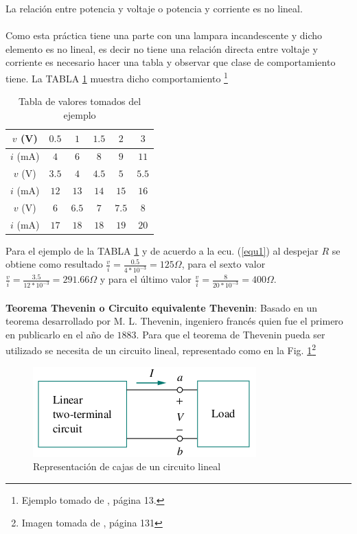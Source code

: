\documentclass[twocolumn]{IEEEtran}
\begin{document}
\noindent
La relación entre potencia y voltaje o potencia y corriente es no lineal.\\\\
\noindent
Como esta práctica tiene una parte con una lampara incandescente y dicho elemento es no lineal, es decir no tiene una relación directa entre voltaje y corriente es necesario hacer una tabla y observar que clase de comportamiento tiene. La TABLA \ref{tab1} muestra dicho comportamiento \footnote{Ejemplo tomado de \cite{nahvi}, página 13.}
\begin{table}[H]
	\centering
\begin{tabular}[c]{|c||c|c|c|c|c|} \hline
$v$ (V) & $0.5$ & $1$ & $1.5$ & $2$ & $3$ \\ \hline
$i$ (mA) & $4$ & $6$ & $8$ & $9$ & $11$ \\ \hline \hline
$v$ (V) & $3.5$ & $4$ & $4.5$ & $5$ & $5.5$ \\ \hline
$i$ (mA) & $12$ & $13$ & $14$ & $15$ & $16$ \\ \hline \hline
$v$ (V) & $6$ & $6.5$ & $7$ & $7.5$ & $8$ \\ \hline
$i$ (mA) & $17$ & $18$ & $18$ & $19$ & $20$ \\ \hline
\end{tabular}
	\caption{Tabla de valores tomados del ejemplo}
	\label{tab1}
\end{table}
\noindent
Para el ejemplo de la TABLA \ref{tab1} y de acuerdo a la ecu. (\ref{equ1}) al despejar $R$ se obtiene como resultado $\frac{v}{i} = \frac{0.5}{4*10^{-3}} = 125 \Omega$, para el sexto valor $\frac{v}{i} = \frac{3.5}{12*10^{-3}} = 291.66 \Omega$ y para el último valor $\frac{v}{i} = \frac{8}{20*10^{-3}} = 400 \Omega$.\\\\
\textbf{Teorema Thevenin o Circuito equivalente Thevenin}:
Basado en un teorema desarrollado por M. L. Thevenin, ingeniero francés quien fue el primero en publicarlo en el año de $1883$. Para que el teorema de Thevenin pueda ser utilizado se necesita de un circuito lineal, representado como en la Fig. \ref{fig1}\footnote{Imagen tomada de \cite{sadiku}, página 131}
\begin{figure}[H]
	\centering
		\includegraphics[scale=0.6]{th1.png}
	\caption{Representación de cajas de un circuito lineal}
	\label{fig1}
\end{figure}
\end{document}
